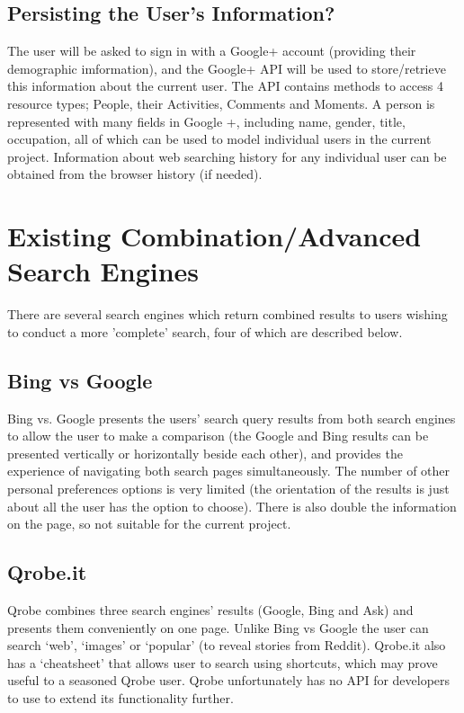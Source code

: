 \documentclass[10pt]{article}
\begin{document}
\subsection{Persisting the User's Information?}
The user will be asked to sign in with a Google+ account (providing their demographic imformation), and the Google+ API will be used to store/retrieve this information about the current user. The API contains methods to access 4 resource  types; People, their Activities, Comments and Moments. A person is represented with many fields in Google +, including name, gender, title, occupation, all of which can be used to model individual users in the current project. Information about web searching history for any individual user can be obtained from the browser history (if needed). 

\section{Existing Combination/Advanced Search Engines}\label{Existing Combination/Advanced Search Engines}
There are several search engines which return combined results to users wishing to conduct a more 'complete' search, four of which are described below. 

\subsection{Bing vs Google}
Bing vs. Google presents the users’ search query results from both search engines to allow the user to make a comparison (the Google and Bing results can be presented vertically or horizontally beside each other), and provides the experience of navigating both search pages simultaneously.  
The number of other personal preferences options is very limited (the orientation of the results is just about all the user has the option to choose). There is also double the information on the page, so not suitable for the current project.

\subsection{Qrobe.it}
Qrobe combines three search engines’ results (Google, Bing and Ask) and presents them conveniently on one page. Unlike Bing vs Google the user can search ‘web’, ‘images’ or ‘popular’ (to reveal stories from Reddit). Qrobe.it also has a ‘cheatsheet’ that allows user to search using shortcuts, which may prove useful to a seasoned Qrobe user. Qrobe unfortunately has no API for developers to use to extend its functionality further.
\end{document}
